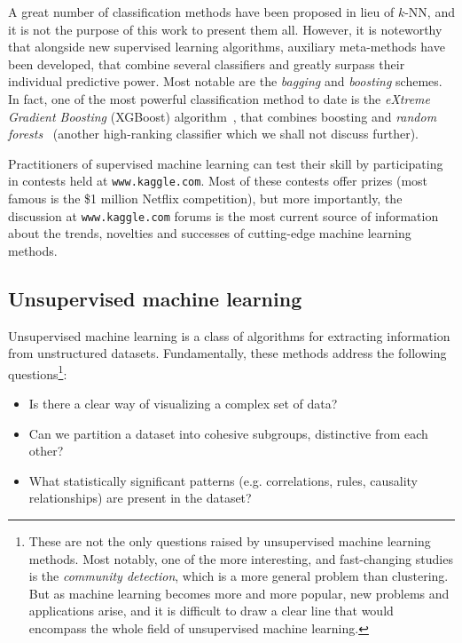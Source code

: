 \documentclass[a4paper,11pt,twoside]{book}%
\begin{document}
A great number of classification methods have been proposed in lieu of $k$-NN, and it is not the purpose of this work to present them all.
However, it is noteworthy that alongside new supervised learning algorithms, auxiliary meta-methods have been developed, that combine several classifiers and greatly surpass their individual predictive power.
Most notable are the \emph{bagging} and \emph{boosting} schemes.
In fact, one of the most powerful classification method to date is the \emph{eXtreme Gradient Boosting} (XGBoost) algorithm~\cite{chen2016xgboost}, that combines boosting and \emph{random forests}~\cite{ho1995random} (another high-ranking classifier which we shall not discuss further).

Practitioners of supervised machine learning can test their skill by participating in contests held at \texttt{www.kaggle.com}.
Most of these contests offer prizes (most famous is the \$1 million Netflix competition), but more importantly, the discussion at \texttt{www.kaggle.com} forums is the most current source of information about the trends, novelties and successes of cutting-edge machine learning methods. 

\subsection{Unsupervised machine learning}

Unsupervised machine learning is a class of algorithms for extracting information from unstructured datasets.
Fundamentally, these methods address the following questions\footnote{
These are not the only questions raised by unsupervised machine learning methods.
Most notably, one of the more interesting, and fast-changing studies is the \emph{community detection}, which is a more general problem than clustering.
But as machine learning becomes more and more popular, new problems and applications arise, and it is difficult to draw a clear line that would encompass the whole field of unsupervised machine learning.}:
\begin{itemize}
 \item Is there a clear way of visualizing a complex set of data?
 \item Can we partition a dataset into cohesive subgroups, distinctive from each other?
 \item What  statistically significant patterns (e.g. correlations, rules, causality relationships) are present in the dataset?
\end{itemize}
\end{document}
